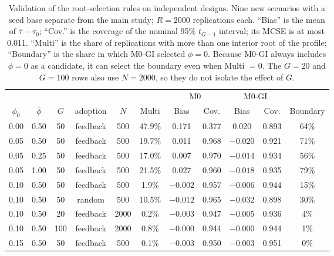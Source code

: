 \begin{table}[!t]
\centering
\caption{Validation of the root-selection rules on independent designs. Nine new scenarios
with a seed base separate from the main study; $R=2000$ replications each. ``Bias'' is the
mean of $\hat\tau-\tau_0$; ``Cov.'' is the coverage of the nominal 95\% $t_{G-1}$ interval;
its MCSE is at most 0.011. ``Multi'' is the share of replications with more than one
interior root of the profile; ``Boundary'' is the share in which M0-GI selected $\phi=0$.
Because M0-GI always includes $\phi=0$ as a candidate, it can select the boundary even
when Multi $=0$. The $G=20$ and $G=100$ rows also use
$N=2000$, so they do not isolate the effect of $G$.}
\label{tab:rsel}
\small
\setlength{\tabcolsep}{4pt}
\begin{tabular}{ccccccccccc}
\toprule
 & & & & & & \multicolumn{2}{c}{M0} & \multicolumn{2}{c}{M0-GI} & \\
\cmidrule(lr){7-8}\cmidrule(lr){9-10}
$\phi_0$ & $\bar\phi$ & $G$ & adoption & $N$ & Multi & Bias & Cov. & Bias & Cov. & Boundary \\
\midrule
0.00 & 0.50 & 50 & feedback & 500 & 47.9\% & 0.171 & 0.377 & 0.020 & 0.893 & 64\% \\
0.05 & 0.50 & 50 & feedback & 500 & 19.7\% & 0.011 & 0.968 & $-0.020$ & 0.921 & 71\% \\
0.05 & 0.25 & 50 & feedback & 500 & 17.0\% & 0.007 & 0.970 & $-0.014$ & 0.934 & 56\% \\
0.05 & 1.00 & 50 & feedback & 500 & 21.5\% & 0.027 & 0.960 & $-0.018$ & 0.935 & 79\% \\
0.10 & 0.50 & 50 & feedback & 500 & 1.9\% & $-0.002$ & 0.957 & $-0.006$ & 0.944 & 15\% \\
0.10 & 0.50 & 50 & random & 500 & 10.5\% & $-0.012$ & 0.965 & $-0.032$ & 0.898 & 30\% \\
0.10 & 0.50 & 20 & feedback & 2000 & 0.2\% & $-0.003$ & 0.947 & $-0.005$ & 0.936 & 4\% \\
0.10 & 0.50 & 100 & feedback & 2000 & 0.8\% & $-0.000$ & 0.944 & $-0.000$ & 0.944 & 1\% \\
0.15 & 0.50 & 50 & feedback & 500 & 0.1\% & $-0.003$ & 0.950 & $-0.003$ & 0.951 & 0\% \\
\bottomrule
\end{tabular}
\end{table}
